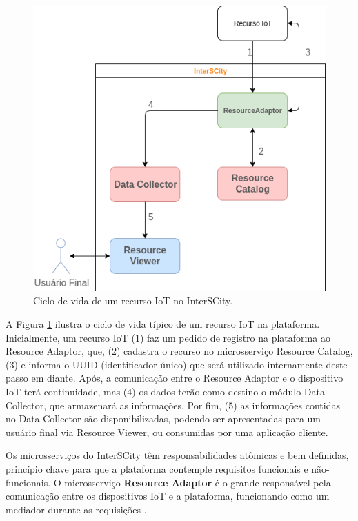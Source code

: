 \begin{figure}
  \centering
    \includegraphics[scale=0.5]{figuras/interscity_flow.png}
  \caption{Ciclo de vida de um recurso IoT no InterSCity.}
  \label{fig:interscity-lifecycle}
\end{figure}

A Figura \ref{fig:interscity-lifecycle} ilustra o ciclo de vida típico de um
recurso IoT na plataforma. Inicialmente, um recurso IoT (1) faz um pedido de
registro na plataforma ao Resource Adaptor, que, (2) cadastra o recurso no
microsserviço Resource Catalog, (3) e informa o UUID
(identificador único) que será utilizado internamente deste passo em diante.
Após, a comunicação entre o Resource Adaptor e o dispositivo IoT terá
continuidade, mas (4) os dados terão como destino o módulo Data Collector,
que armazenará as informações. Por fim, (5) as informações contidas no
Data Collector são disponibilizadas, podendo ser apresentadas para um usuário
final via Resource Viewer, ou consumidas por uma aplicação cliente.

Os microsserviços do InterSCity têm responsabilidades atômicas e bem
definidas, princípio chave para que a plataforma contemple requisitos funcionais
e não-funcionais. O microsserviço \textbf{Resource Adaptor} é o grande
responsável pela comunicação entre os dispositivos IoT e a plataforma,
funcionando como um mediador durante as requisições \cite{delesposte2017}.

